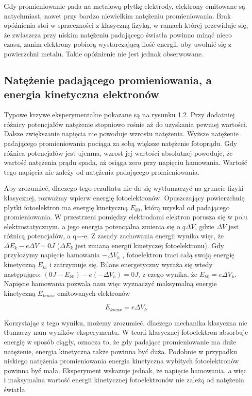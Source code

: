 \documentclass[12pt, a4paper, notitlepage]{report}
\begin{document}
	Gdy promieniowanie pada na metalową płytkę elektrody, elektrony emitowane są
	natychmiast, nawet przy bardzo niewielkim natężeniu promieniowania. Brak
	opóźnienia stoi w sprzeczności z klasyczną fizyką, w ramach której przewiduje się,
	że zwłaszcza przy niskim natężeniu padającego światła powinno minąć nieco
	czasu, zanim elektrony pobiorą wystarczającą ilość energii, aby uwolnić się z
	powierzchni metalu. Takie opóźnienie nie jest jednak obserwowane.

	\subsection{Natężenie padającego promieniowania, a energia kinetyczna elektronów}

	Typowe krzywe eksperymentalne pokazane są na rysunku 1.2. Przy dodatniej różnicy
	potencjałów natężenie stopniowo rośnie aż do uzyskania pewniej wartości.
	Dalsze zwiększanie napięcia nie powoduje wzrostu natężenia. Wyższe natężenie padającego
	promieniowania pociąga za sobą większe natężenie fotoprądu. Gdy różnica
	potencjałów jest ujemna, wzrost jej wartości absolutnej powoduje, że wartość
	natężenia prądu spada, aż osiąga zero przy napięciu hamowania. Wartość tego
	napięcia nie zależy od natężenia padającego promieniowania.

	Aby zrozumieć, dlaczego tego rezultatu nie da się wytłumaczyć na gruncie fizyki
	klasycznej, rozważmy wpierw energię fotoelektronów. Opuszczający powierzchnię płytki
	fotoelektron ma energię kinetyczną $E_{k0}$, którą uzyskał od padającego
	promieniowania. W przestrzeni pomiędzy elektrodami elektron porusza się w polu
	elektrostatycznym, a jego energia potencjalna zmienia się o $q\Delta V$, gdzie
	$\Delta V$ jest różnicą potencjałów, a q=-e. Z zasady zachowania energii
	wynika więc, że $\Delta E_{k}-e\Delta V=0J$ ($\Delta E_{k}$ jest zmianą
	energii kinetyczej fotoelektronu). Gdy przyłożymy napięcie hamowania
	$-\Delta V_{h}$ , fotoelektron traci całą swoją energię kinetyczną $E_{ki}$ i
	zatrzymuje się. Bilans energetyczny wyraża się wtedy następująco:
	$(0J-E_{k0})-e(-\Delta V_{h})=0J$, z czego wynika, że $E_{k0}=e\Delta V_{h}$. Napięcie
	hamowania pozwala nam więc wyznaczyć maksymalną energie kinetyczną $E_{kmax}$ emitowanych
	elektronów

	\begin{equation}
		E_{kmax}=e\Delta V_{h}
	\end{equation}

	Korzystając z tego wyniku, możemy zrozumieć, dlaczego mechanika klasyczna nie tłumaczy
	nam wyników eksperymentu. W teorii klasycznej fotoelektron absorbuje energię w
	sposób ciągły, oznacza to, że gdy padające promieniowanie ma duże natężenie, energia
	kinetyczna także powinna być duża. Podobnie w przypadku niskiego natężenia
	promieniowania energia kinetyczna wybitych fotoelektronów powinna być mała. Eksperyment
	wskazuje jednak, że napięcie hamowania, a więc i maksymalna wartość energii kinetycznej
	fotoelektronów nie zależą od natężenia światła.
\end{document}
